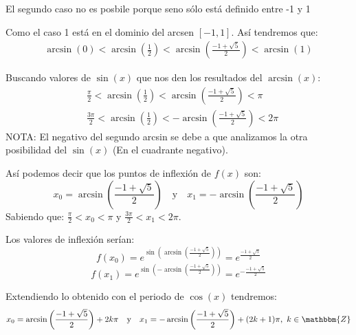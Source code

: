 \documentclass[12pt]{article}
\begin{document}
\begin{enumerate}[\hspace{9px} a)]
            El segundo caso no es posbile porque seno s\'olo est\'a definido entre -1 y 1\medskip

            Como el caso 1 est\'a en el dominio del arcsen \([-1,1]\). As\'i tendremos que:
            \begin{align*}
                \arcsin(0)<\arcsin\left(\frac{1}{2}\right)<\arcsin\left(\frac{-1+\sqrt{5}}{2}\right)<\arcsin(1)
            \end{align*}

            Buscando valores de \(\sin(x)\) que nos den los resultados del \(\arcsin(x)\):
            \begin{align*}
                &\frac{\pi}{2}<\arcsin\left(\frac{1}{2}\right)<\arcsin\left(\frac{-1+\sqrt{5}}{2}\right)<\pi\\
                &\frac{3\pi}{2}<\arcsin\left(\frac{1}{2}\right)<-\arcsin\left(\frac{-1+\sqrt{5}}{2}\right)<2\pi
            \end{align*}
            NOTA: El negativo del segundo arcsin se debe a que analizamos la otra posibilidad del \(\sin(x)\) (En el cuadrante negativo).\medskip

            As\'i podemos decir que los puntos de inflexi\'on de \(f(x)\) son:
            \begin{equation*}
                x_0 = \arcsin\left(\frac{-1+\sqrt{5}}{2}\right) \quad \text{y} \quad x_1 = -\arcsin\left(\frac{-1+\sqrt{5}}{2}\right)
            \end{equation*}
            Sabiendo que: \(\displaystyle\frac{\pi}{2}<x_0<\pi\) y \(\displaystyle\frac{3\pi}{2}<x_1<2\pi\).\medskip

            Los valores de inflexi\'on ser\'ian:
            \begin{equation*}
                f(x_0) = e^{\sin\left(\arcsin\left(\frac{-1+\sqrt{5}}{2}\right)\right)} = e^{\frac{-1+\sqrt{5}}{2}}
            \end{equation*}
            \begin{equation*}
                f(x_1) = e^{\sin\left(-\arcsin\left(\frac{-1+\sqrt{5}}{2}\right)\right)} = e^{-\frac{-1+\sqrt{5}}{2}}
            \end{equation*}

            Extendiendo lo obtenido con el periodo de \(\cos(x)\) tendremos:
            \begin{equation*}
                x_0 = \arcsin\left(\frac{-1+\sqrt{5}}{2}\right)+2k\pi \quad \text{y} \quad x_1 = -\arcsin\left(\frac{-1+\sqrt{5}}{2}\right)+(2k+1)\pi, \ k \in \mathbbm{Z}
            \end{equation*}


\end{enumerate}
\end{document}
